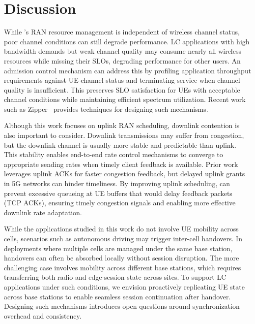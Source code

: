 \section{Discussion}
\label{sec:discuss}

While \sys{}'s RAN resource management is independent of wireless channel status, poor channel conditions can still degrade performance. 
LC applications with high bandwidth demands but weak channel quality may consume nearly all wireless resources while missing their SLOs, degrading performance for other users. 
An admission control mechanism can address this by profiling application throughput requirements against UE channel status and terminating service when channel quality is insufficient. 
This preserves SLO satisfaction for UEs with acceptable channel conditions while maintaining efficient spectrum utilization. 
Recent work such as Zipper~\cite{zipper24nsdi} provides techniques for designing such mechanisms.

Although this work focuses on uplink RAN scheduling, downlink contention is also important to consider. 
Downlink transmissions may suffer from congestion, but the downlink channel is usually more stable and predictable than uplink.
This stability enables end-to-end rate control mechanisms to converge to appropriate sending rates when timely client feedback is available. 
Prior work~\cite{zhuge22sigcomm} leverages uplink ACKs for faster congestion feedback, but delayed uplink grants in 5G networks can hinder timeliness. 
By improving uplink scheduling, \sys{} can prevent excessive queueing at UE buffers that would delay feedback packets (\eg TCP ACKs), ensuring timely congestion signals and enabling more effective downlink rate adaptation.

While the applications studied in this work do not involve UE mobility across cells, scenarios such as autonomous driving may trigger inter-cell handovers. 
In deployments where multiple cells are managed under the same base station, handovers can often be absorbed locally without session disruption. 
The more challenging case involves mobility across different base stations, which requires transferring both radio and edge-session state across sites.
To support LC applications under such conditions, we envision proactively replicating UE state across base stations to enable seamless session continuation after handover. 
Designing such mechanisms introduces open questions around synchronization overhead and consistency.

